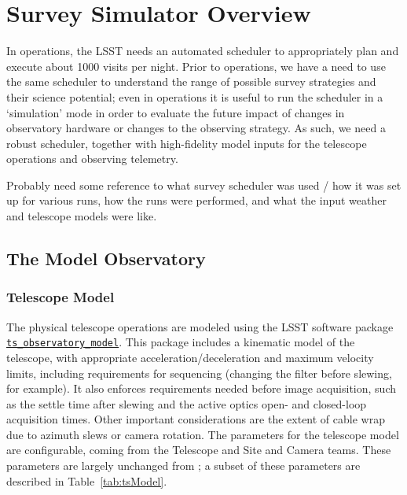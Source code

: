 \section{Survey Simulator Overview}
\label{section:simulator}

In operations, the LSST needs an automated scheduler to appropriately plan and execute about 1000 visits per night. Prior to operations, we have a need to use the same scheduler to understand the range of possible survey strategies and their science potential; even in operations it is useful to run the scheduler in a `simulation' mode in order to evaluate the future impact of changes in observatory hardware or changes to the observing strategy. As such, we need a robust scheduler, together with high-fidelity model inputs for the telescope operations and observing telemetry.  

Probably need some reference to what survey scheduler was used / how it was set up for various runs, how the runs were performed, and what the input weather and telescope models were like. 

\subsection{The Model Observatory}


\subsubsection{Telescope Model}

The physical telescope operations are modeled using the LSST software package \href{https://github.com/lsst-ts/ts_observatory_model}{\tt ts\_observatory\_model}. This package includes a kinematic model of the telescope, with appropriate acceleration/deceleration and maximum velocity limits, including requirements for sequencing (changing the filter before slewing, for example). It also enforces requirements needed before image acquisition, such as the settle time after slewing and the active optics open- and closed-loop acquisition times. Other important considerations are the extent of cable wrap due to azimuth slews or camera rotation. The parameters for the telescope model are configurable, coming from the Telescope and Site and Camera teams. These parameters are largely unchanged from \citet{Delgado14}; a subset of these parameters are described in Table~\ref{tab:tsModel}. 

